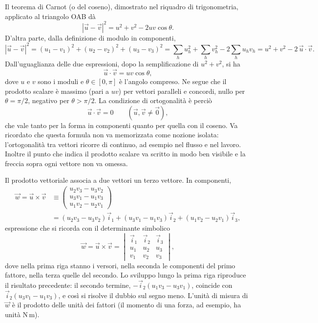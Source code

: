 \documentclass[main.tex]{subfiles}
\begin{document}
Il teorema di Carnot (o del coseno), dimostrato nel riquadro di trigonometria, applicato al triangolo OAB dà
\[
|\vec u-\vec v|^2=u^2+v^2-2uv\cos\theta .
\]
D'altra parte, dalla definizione di modulo in componenti,
\[
|\vec u-\vec v|^2=(u_1-v_1)^2+(u_2-v_2)^2+(u_3-v_3)^2=\sum_h u_h^2+\sum_h v_h^2-2\sum_h u_hv_h=u^2+v^2-2\,\vec u\cdot\vec v .
\]
Dall'uguaglianza delle due espressioni, dopo la semplificazione di $u^2+v^2$, si ha
\[
\vec u\cdot\vec v=uv\cos\theta ,
\]
dove $u$ e $v$ sono i moduli e $\theta\in[0,\pi]$ è l'angolo compreso. Ne segue che il prodotto scalare è massimo (pari a $uv$) per vettori paralleli e concordi, nullo per $\theta=\pi/2$, negativo per $\theta>\pi/2$. La condizione di ortogonalità è perciò
\[
\vec u\cdot\vec v=0 \qquad(\vec u,\vec v\neq\vec 0),
\]
che vale tanto per la forma in componenti quanto per quella con il coseno. Va ricordato che questa formula non va memorizzata come nozione isolata: l'ortogonalità tra vettori ricorre di continuo, ad esempio nel flusso e nel lavoro. Inoltre il punto che indica il prodotto scalare va scritto in modo ben visibile e la freccia sopra ogni vettore non va omessa.

Il prodotto vettoriale associa a due vettori un terzo vettore. In componenti,
\begin{align*}
\vec w=\vec u\times\vec v&\equiv\begin{pmatrix}u_2v_3-u_3v_2\\u_3v_1-u_1v_3\\u_1v_2-u_2v_1\end{pmatrix}\\
&=(u_2v_3-u_3v_2)\vec i_1+(u_3v_1-u_1v_3)\vec i_2+(u_1v_2-u_2v_1)\vec i_3 ,
\end{align*}
espressione che si ricorda con il determinante simbolico
\[
\vec w=\vec u\times\vec v=\begin{vmatrix}\vec i_1&\vec i_2&\vec i_3\\u_1&u_2&u_3\\v_1&v_2&v_3\end{vmatrix},
\]
dove nella prima riga stanno i versori, nella seconda le componenti del primo fattore, nella terza quelle del secondo. Lo sviluppo lungo la prima riga riproduce il risultato precedente: il secondo termine, $-\vec i_2(u_1v_3-u_3v_1)$, coincide con $\vec i_2(u_3v_1-u_1v_3)$, e così si risolve il dubbio sul segno meno. L'unità di misura di $\vec w$ è il prodotto delle unità dei fattori (il momento di una forza, ad esempio, ha unità $\mathrm{N\,m}$).
\end{document}
